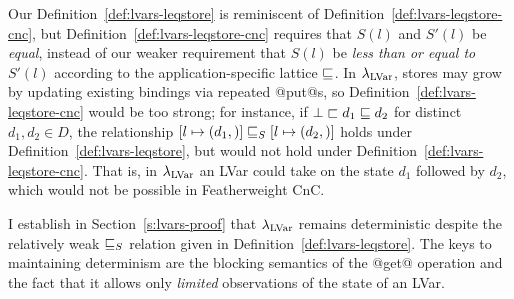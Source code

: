 Our Definition~\ref{def:lvars-leqstore} is reminiscent of
Definition~\ref{def:lvars-leqstore-cnc}, but
Definition~\ref{def:lvars-leqstore-cnc} requires that $S(l)$ and
$S'(l)$ be \emph{equal}, instead of our weaker requirement that $S(l)$
be \emph{less than or equal to} $S'(l)$ according to the
application-specific lattice $\sqsubseteq$.  In $\lambda_{\textrm{LVar}}$, stores may
grow by updating existing bindings via repeated @put@s, so
Definition~\ref{def:lvars-leqstore-cnc} would be too strong; for
instance, if $\bot \sqsubset d_1 \sqsubseteq d_2$ for distinct $d_1, d_2
\in D$, the relationship
$\left[ l \mapsto (d_1, \right)] \sqsubseteq_S \left[ l \mapsto (d_2, \right)]$
holds under Definition~\ref{def:lvars-leqstore}, but would not hold
under Definition~\ref{def:lvars-leqstore-cnc}.  That is, in
$\lambda_{\textrm{LVar}}$ an LVar could take on the state $d_1$ followed by $d_2$,
which would not be possible in Featherweight CnC.

I establish in Section~\ref{s:lvars-proof} that $\lambda_{\textrm{LVar}}$ remains
deterministic despite the relatively weak $ \sqsubseteq_S $ relation
given in Definition~\ref{def:lvars-leqstore}.  The keys to maintaining
determinism are the blocking semantics of the @get@ operation and the
fact that it allows only \emph{limited} observations of the state of
an LVar.
